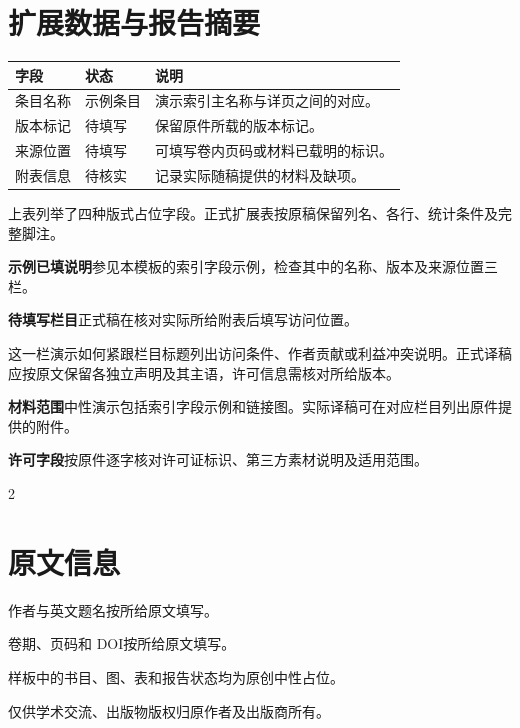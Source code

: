 \documentclass[UTF8,fontset=none,scheme=plain]{ctexart}
\newcommand{\ReportHeading}[1]{\par\medskip\noindent{\sffamily\bfseries\textcolor{ReportRed}{#1}}\par
  \vspace{2bp}{\color{ReportRed}\hrule height .5bp}\vspace{5bp}}
\begin{document}
\section*{扩展数据与报告摘要}
\par\vspace{4bp}
\begingroup\sffamily\fontsize{8bp}{11bp}\selectfont
\renewcommand{\arraystretch}{1.35}
\noindent\begin{tabularx}{\textwidth}{@{}p{}p{}X@{}}
  \toprule 字段 & 状态 & 说明 \\\midrule
  条目名称 & 示例条目 & 演示索引主名称与详页之间的对应。 \\
  版本标记 & 待填写 & 保留原件所载的版本标记。 \\
  来源位置 & 待填写 & 可填写卷内页码或材料已载明的标识。 \\
  附表信息 & 待核实 & 记录实际随稿提供的材料及缺项。 \\\bottomrule
\end{tabularx}\par
\noindent 上表列举了四种版式占位字段。正式扩展表按原稿保留列名、各行、统计条件及完整脚注。\par
\endgroup

\medskip
\ReportHeading{报告栏目与状态}
\noindent\textbf{示例已填说明}\quad 参见本模板的索引字段示例，检查其中的名称、版本及来源位置三栏。\par
\noindent\textbf{待填写栏目}\quad 正式稿在核对实际所给附表后填写访问位置。\par
\ReportHeading{资料和声明}
\noindent 这一栏演示如何紧跟栏目标题列出访问条件、作者贡献或利益冲突说明。正式译稿应按原文保留各独立声明及其主语，许可信息需核对所给版本。\par
\noindent\textbf{材料范围}\quad 中性演示包括索引字段示例和链接图。实际译稿可在对应栏目列出原件提供的附件。\par
\noindent\textbf{许可字段}\quad 按原件逐字核对许可证标识、第三方素材说明及适用范围。\par

\begin{multicols}{2}
\SampleBibliography
\section*{原文信息}
\noindent 作者与英文题名\quad 按所给原文填写。\par
\noindent 卷期、页码和 DOI\quad 按所给原文填写。\par
\noindent 样板中的书目、图、表和报告状态均为原创中性占位。\par
\medskip\noindent 仅供学术交流、出版物版权归原作者及出版商所有。\par
\end{multicols}
\clearpage

\end{document}
